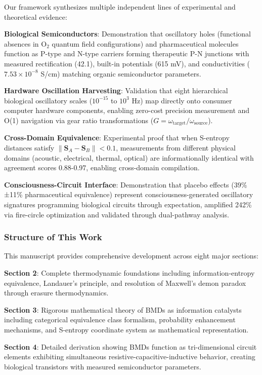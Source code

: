 \documentclass[11pt,a4paper]{article}
\begin{document}
Our framework synthesizes multiple independent lines of experimental and theoretical evidence:

\textbf{Biological Semiconductors}: Demonstration that oscillatory holes (functional absences in O$_2$ quantum field configurations) and pharmaceutical molecules function as P-type and N-type carriers forming therapeutic P-N junctions with measured rectification (42.1), built-in potentials (615 mV), and conductivities ($7.53\times10^{-8}$ S/cm) matching organic semiconductor parameters.

\textbf{Hardware Oscillation Harvesting}: Validation that eight hierarchical biological oscillatory scales ($10^{-15}$ to $10^3$ Hz) map directly onto consumer computer hardware components, enabling zero-cost precision measurement and O(1) navigation via gear ratio transformations ($G = \omega_{\text{target}}/\omega_{\text{source}}$).

\textbf{Cross-Domain Equivalence}: Experimental proof that when S-entropy distances satisfy $\|\mathbf{S}_A - \mathbf{S}_B\| < 0.1$, measurements from different physical domains (acoustic, electrical, thermal, optical) are informationally identical with agreement scores 0.88-0.97, enabling cross-domain compilation.

\textbf{Consciousness-Circuit Interface}: Demonstration that placebo effects (39\%±11\% pharmaceutical equivalence) represent consciousness-generated oscillatory signatures programming biological circuits through expectation, amplified 242\% via fire-circle optimization and validated through dual-pathway analysis.

\subsubsection{Structure of This Work}

This manuscript provides comprehensive development across eight major sections:

\textbf{Section 2}: Complete thermodynamic foundations including information-entropy equivalence, Landauer's principle, and resolution of Maxwell's demon paradox through erasure thermodynamics.

\textbf{Section 3}: Rigorous mathematical theory of BMDs as information catalysts including categorical equivalence class formalism, probability enhancement mechanisms, and S-entropy coordinate system as mathematical representation.

\textbf{Section 4}: Detailed derivation showing BMDs function as tri-dimensional circuit elements exhibiting simultaneous resistive-capacitive-inductive behavior, creating biological transistors with measured semiconductor parameters.
\end{document}

